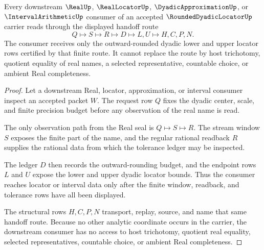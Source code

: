 \begin{theorem}
\label{thm:rounded-dyadic-locator-window-handoff}
Every downstream $\RealUp$, $\RealLocatorUp$, $\DyadicApproximationUp$, or $\IntervalArithmeticUp$ consumer of an accepted $\RoundedDyadicLocatorUp$ carrier reads through the displayed handoff route
$$
Q\longmapsto S\longmapsto R\longmapsto D\longmapsto L,U\longmapsto H,C,P,N .
$$
The consumer receives only the outward-rounded dyadic lower and upper locator rows certified by that finite route. It cannot replace the route by host trichotomy, quotient equality of real names, a selected representative, countable choice, or ambient Real completeness.
\end{theorem}
\begin{proof}
Let a downstream Real, locator, approximation, or interval consumer inspect an accepted packet $W$. The request row $Q$ fixes the dyadic center, scale, and finite precision budget before any observation of the real name is read.

The only observation path from the Real seal is $Q\longmapsto S\longmapsto R$. The stream window $S$ exposes the finite part of the name, and the regular rational readback $R$ supplies the rational data from which the tolerance ledger may be inspected.

The ledger $D$ then records the outward-rounding budget, and the endpoint rows $L$ and $U$ expose the lower and upper dyadic locator bounds. Thus the consumer reaches locator or interval data only after the finite window, readback, and tolerance rows have all been displayed.

The structural rows $H,C,P,N$ transport, replay, source, and name that same handoff route. Because no other analytic coordinate occurs in the carrier, the downstream consumer has no access to host trichotomy, quotient real equality, selected representatives, countable choice, or ambient Real completeness.
\end{proof}


